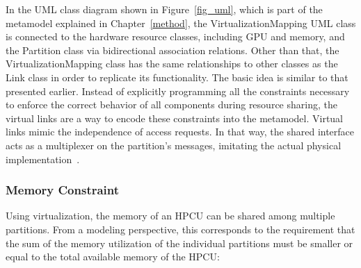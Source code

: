         
        In the UML class diagram shown in Figure~\ref{fig_uml}, which is part of the metamodel explained in Chapter~\ref{method}, the VirtualizationMapping UML class is connected to the hardware resource classes, including GPU and memory, and the Partition class via bidirectional association relations. Other than that, the VirtualizationMapping class has the same relationships to other classes as the Link class in order to replicate its functionality. The basic idea is similar to that presented earlier. Instead of explicitly programming all the constraints necessary to enforce the correct behavior of all components during resource sharing, the virtual links are a way to encode these constraints into the metamodel. Virtual links mimic the independence of access requests. In that way, the shared interface acts as a multiplexer on the partition's messages, imitating the actual physical implementation~\cite{10588416}.
        
        
        

        
        \subsubsection{Memory Constraint}
        
       Using virtualization, the memory of an HPCU can be shared among multiple partitions. From a modeling perspective, this corresponds to the requirement that the sum of the memory utilization of the individual partitions must be smaller or equal to the total available memory of the HPCU:\newline 
        
